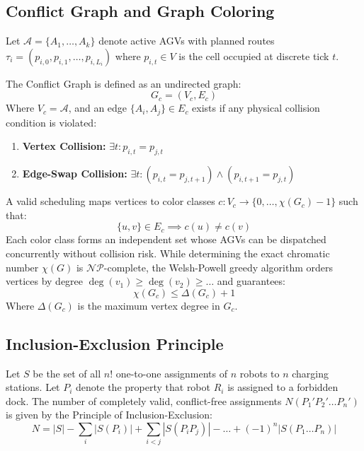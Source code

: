 \documentclass[conference]{IEEEtran}
\begin{document}
\subsection{Conflict Graph and Graph Coloring}
Let $\mathcal{A} = \{A_1, \dots, A_k\}$ denote active AGVs with planned routes $\tau_i = (p_{i,0}, p_{i,1}, \dots, p_{i,L_i})$ where $p_{i,t} \in V$ is the cell occupied at discrete tick $t$.

The Conflict Graph is defined as an undirected graph:
\begin{equation}
G_c = (V_c, E_c)
\end{equation}
Where $V_c = \mathcal{A}$, and an edge $\{A_i, A_j\} \in E_c$ exists if any physical collision condition is violated:
\begin{enumerate}
    \item \textbf{Vertex Collision:} $\exists t : p_{i,t} = p_{j,t}$
    \item \textbf{Edge-Swap Collision:} $\exists t : (p_{i,t} = p_{j,t+1}) \land (p_{i,t+1} = p_{j,t})$
\end{enumerate}

A valid scheduling maps vertices to color classes $c: V_c \to \{0, \dots, \chi(G_c)-1\}$ such that:
\begin{equation}
\{u, v\} \in E_c \implies c(u) \ne c(v)
\end{equation}
Each color class forms an independent set whose AGVs can be dispatched concurrently without collision risk. While determining the exact chromatic number $\chi(G)$ is $\mathcal{NP}$-complete, the Welsh-Powell greedy algorithm orders vertices by degree $\deg(v_1) \ge \deg(v_2) \ge \dots$ and guarantees:
\begin{equation}
\chi(G_c) \le \Delta(G_c) + 1
\end{equation}
Where $\Delta(G_c)$ is the maximum vertex degree in $G_c$.

\subsection{Inclusion-Exclusion Principle}
Let $S$ be the set of all $n!$ one-to-one assignments of $n$ robots to $n$ charging stations. Let $P_i$ denote the property that robot $R_i$ is assigned to a forbidden dock. The number of completely valid, conflict-free assignments $N(P_1' P_2' \dots P_n')$ is given by the Principle of Inclusion-Exclusion:
\begin{equation}
N = |S| - \sum_{i} |S(P_i)| + \sum_{i < j} |S(P_i P_j)| - \dots + (-1)^n |S(P_1 \dots P_n)|
\end{equation}
\end{document}
